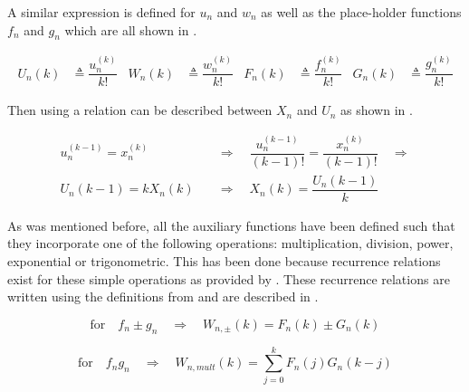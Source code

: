 A similar expression is defined for $u_{n}$ and $w_{n}$ as well as the place-holder functions $f_{n}$ and $g_{n}$ which are all shown in .

\begin{align} \label{eq:redDer}
U_{n}\left(k\right)& \triangleq \dfrac{u_{n}^{\left(k\right)}}{k!}
&
W_{n}\left(k\right)& \triangleq \dfrac{w_{n}^{\left(k\right)}}{k!}
&
F_{n}\left(k\right)& \triangleq \dfrac{f_{n}^{\left(k\right)}}{k!}
&
G_{n}\left(k\right)& \triangleq \dfrac{g_{n}^{\left(k\right)}}{k!}
\end{align}



Then using  a relation can be described between $X_{n}$ and $U_{n}$ as shown in  \citep{scott2008high}. 

\begin{equation} \label{eq:UnXn}
\begin{split}
u_{n}^{\left( k-1\right)}=x_{n}^{\left( k\right)} \quad &\Rightarrow \quad \dfrac{u_{n}^{\left( k-1\right)}}{\left(k-1\right)!} = \dfrac{x_{n}^{\left( k\right)}}{\left(k-1\right)!} \quad \Rightarrow\\
U_{n}\left(k-1\right)=kX_{n}\left(k\right) \quad &\Rightarrow \quad X_{n}\left(k\right)=\dfrac{U_{n}\left(k-1\right)}{k}
\end{split}
\end{equation}

As was mentioned before, all the auxiliary functions have been defined such that they incorporate one of the following operations: multiplication, division, power, exponential or trigonometric. This has been done because recurrence relations exist for these simple operations as provided by \cite{jorba2005software}. These recurrence relations are written using the definitions from  and are described in .

\begin{equation} \label{eq:recRel1}
\text{for} \quad f_{n} \pm g_{n} \quad \Rightarrow \quad W_{n,\pm}\left(k\right)= F_{n}\left(k\right) \pm G_{n}\left(k\right)
\end{equation}

\begin{equation} \label{eq:recRel2}
\text{for} \quad f_{n}g_{n} \quad \Rightarrow \quad W_{n,mult}\left(k\right)=\displaystyle\sum_{j=0}^{k}F_{n}\left(j\right)G_{n}\left(k-j\right)
\end{equation}

